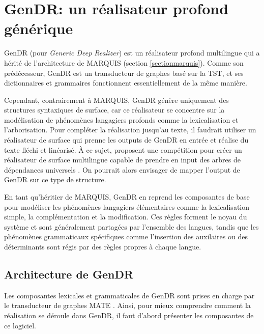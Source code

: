 
\chapter{GenDR: un réalisateur profond générique}\label{chapgendr}

GenDR (pour \emph{Generic Deep Realizer}) est un réalisateur profond multilingue \citep{lareau18} qui a hérité de l'architecture de MARQUIS \citep{WannerMARQUISGENERATIONUSERTAILORED2010} (section \ref{sectionmarquis}). Comme son prédécesseur, GenDR est un transducteur de graphes basé sur la \ac{TST}, et ses dictionnaires et grammaires fonctionnent essentiellement de la même manière.

Cependant, contrairement à MARQUIS, GenDR génère uniquement des structures syntaxiques de surface, car ce réalisateur se concentre sur la modélisation de phénomènes langagiers profonds comme la lexicalisation et l'arborisation. Pour compléter la réalisation jusqu'au texte, il faudrait utiliser un réalisateur de surface qui prenne les outputs de GenDR en entrée et réalise du texte fléchi et linéarisé. À ce sujet, \cite{MilleSharedTaskProposal2017a} proposent une compétition pour créer un réalisateur de surface multilingue capable de prendre en input des arbres de dépendances universels \citep{NIVRE16.348}. On pourrait alors envisager de mapper l'output de GenDR sur ce type de structure.

En tant qu'héritier de MARQUIS, GenDR en reprend les composantes de base pour modéliser les phénomènes langagiers élémentaires comme la lexicalisation simple, la complémentation et la modification. Ces règles forment le noyau du système et sont généralement partagées par l'ensemble des langues, tandis que les phénomènes grammaticaux spécifiques comme l'insertion des auxilaires ou des déterminants sont régis par des règles propres à chaque langue.

\section{Architecture de GenDR}

Les composantes lexicales et grammaticales de GenDR sont prises en charge par le transducteur de graphes MATE \citep{BohnetDevelopmentEnvironmentMTTbased2000a,BOHNET10}. Ainsi, pour mieux comprendre comment la réalisation se déroule dans GenDR, il faut d'abord présenter les composantes de ce logiciel.

